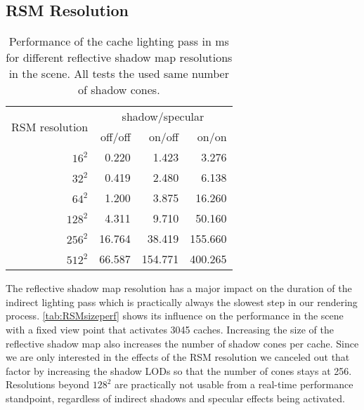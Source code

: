 \documentclass[thesis.tex]{subfiles}
\begin{document}
\subsection{RSM Resolution}
\begin{table}[h]
  \centering
    \begin{tabular}{r|rrr}
    \toprule
    \multirow{2}{*}{RSM resolution} & \multicolumn{3}{c}{ shadow/specular}\\
     & off/off & on/off & on/on \\
    \midrule
    $16^2$    & 0.220 & 1.423 & 3.276 \\
    $32^2$    & 0.419 & 2.480 & 6.138 \\
    $64^2$    & 1.200 & 3.875 & 16.260 \\
    $128^2$   & 4.311 & 9.710 & 50.160 \\
    $256^2$   & 16.764 & 38.419 & 155.660 \\
    $512^2$   & 66.587 & 154.771 & 400.265 \\
    \bottomrule
    \end{tabular}
\caption{Performance of the cache lighting pass in \si{\milli\second} for different reflective shadow map resolutions in the  scene. All tests the used same number of shadow cones. }
\label{tab:RSMsizeperf}
\end{table}
The reflective shadow map resolution has a major impact on the duration of the indirect lighting pass which is practically always the slowest step in our rendering process.
\autoref{tab:RSMsizeperf} shows its influence on the performance in the  scene with a fixed view point that activates 3045 caches.
Increasing the size of the reflective shadow map also increases the number of shadow cones per cache.
Since we are only interested in the effects of the RSM resolution we canceled out that factor by increasing the shadow LODs so that the number of cones stays at 256.
\\
Resolutions beyond $128^2$ are practically not usable from a real-time performance standpoint, regardless of indirect shadows and specular effects being activated.
\end{document}
